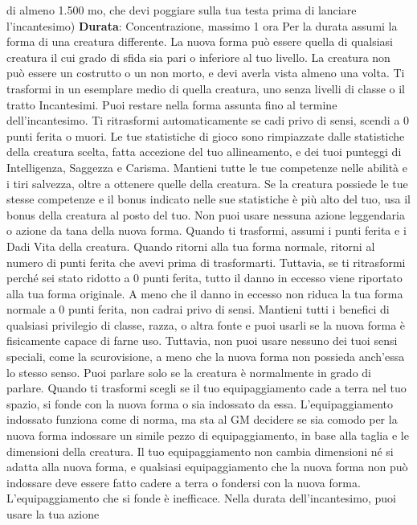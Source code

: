\begin{multicols}{2}
di almeno 1.500 mo, che devi poggiare sulla tua testa
prima di lanciare l’incantesimo)
\textbf{Durata}: Concentrazione, massimo 1 ora
Per la durata assumi la forma di una creatura differente.
La nuova forma può essere quella di qualsiasi creatura
il cui grado di sfida sia pari o inferiore al tuo livello. La 
creatura non può essere un costrutto o un non morto, e
devi averla vista almeno una volta. Ti trasformi in un
esemplare medio di quella creatura, uno senza livelli di
classe o il tratto Incantesimi.
Puoi restare nella forma assunta fino al termine
dell’incantesimo. Ti ritrasformi automaticamente se cadi
privo di sensi, scendi a 0 punti ferita o muori.
Le tue statistiche di gioco sono rimpiazzate dalle
statistiche della creatura scelta, fatta accezione del tuo
allineamento, e dei tuoi punteggi di Intelligenza,
Saggezza e Carisma. Mantieni tutte le tue competenze
nelle abilità e i tiri salvezza, oltre a ottenere quelle della
creatura. Se la creatura possiede le tue stesse
competenze e il bonus indicato nelle sue statistiche è
più alto del tuo, usa il bonus della creatura al posto del
tuo. Non puoi usare nessuna azione leggendaria o
azione da tana della nuova forma.
Quando ti trasformi, assumi i punti ferita e i Dadi Vita
della creatura. Quando ritorni alla tua forma normale,
ritorni al numero di punti ferita che avevi prima di
trasformarti. Tuttavia, se ti ritrasformi perché sei stato
ridotto a 0 punti ferita, tutto il danno in eccesso viene
riportato alla tua forma originale. A meno che il danno in
eccesso non riduca la tua forma normale a 0 punti
ferita, non cadrai privo di sensi.
Mantieni tutti i benefici di qualsiasi privilegio di classe,
razza, o altra fonte e puoi usarli se la nuova forma è
fisicamente capace di farne uso. Tuttavia, non puoi
usare nessuno dei tuoi sensi speciali, come la
scurovisione, a meno che la nuova forma non possieda
anch’essa lo stesso senso. Puoi parlare solo se la
creatura è normalmente in grado di parlare.
Quando ti trasformi scegli se il tuo equipaggiamento
cade a terra nel tuo spazio, si fonde con la nuova forma
o sia indossato da essa. L’equipaggiamento indossato
funziona come di norma, ma sta al GM decidere se sia
comodo per la nuova forma indossare un simile pezzo
di equipaggiamento, in base alla taglia e le dimensioni
della creatura. Il tuo equipaggiamento non cambia
dimensioni né si adatta alla nuova forma, e qualsiasi
equipaggiamento che la nuova forma non può
indossare deve essere fatto cadere a terra o fondersi
con la nuova forma. L’equipaggiamento che si fonde è
inefficace.
Nella durata dell’incantesimo, puoi usare la tua azione

\end{multicols}
